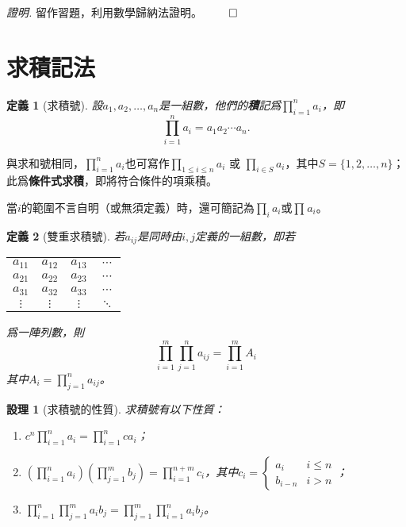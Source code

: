 \documentclass[12pt]{article}
\newtheorem{definition}{定義}
\newtheorem*{proposition}{設理}
\renewenvironment*{proof}{\textit{證明.}}{\hfill$\qed$}
\begin{document}
    \begin{proof}
        留作習題，利用數學歸納法證明。
    \end{proof}

    \section*{求積記法}

    \begin{definition}[求積號]
        設$a_1,a_2,\dots,a_n$是一組數，他們的\textbf{積}記爲$\displaystyle \prod_{i=1}^{n}a_i$，即$$\prod_{i=1}^{n}a_i=a_1a_2\cdots a_n.$$
    \end{definition}

    與求和號相同，$\displaystyle \prod_{i=1}^{n}a_i$也可寫作$\displaystyle \prod_{1\leq i\leq n} a_i$ 或 $\displaystyle\prod_{i\in S}a_i$，其中$S=\{1,2,\dots,n\}$；此爲\textbf{條件式求積}，即將符合條件的項乘積。

    當$i$的範圍不言自明（或無須定義）時，還可簡記為$\displaystyle\prod_{i}a_i$或$\prod_{} a_i$。

    \begin{definition}[雙重求積號]
        若$a_{ij}$是同時由$i,j$定義的一組數，即若
        \begin{center}
            \begin{tabular}{c c c c}
                $a_{11}$&$a_{12}$&$a_{13}$&$\cdots$\\
                $a_{21}$&$a_{22}$&$a_{23}$&$\cdots$\\
                $a_{31}$&$a_{32}$&$a_{33}$&$\cdots$\\
                $\vdots$&$\vdots$&$\vdots$&$\ddots$
            \end{tabular}
        \end{center}
        爲一陣列數，則$$\prod_{i=1}^{m}\prod_{j=1}^{n}a_{ij}=\prod_{i=1}^{m}A_i$$其中$\displaystyle A_i=\prod_{j=1}^{n}a_{ij}$。
    \end{definition}

    \begin{proposition}[求積號的性質]
        求積號有以下性質：\begin{enumerate}
            \item $\displaystyle c^n\prod_{i=1}^{n}a_i=\prod_{i=1}^{n}ca_i$；
            \item $\displaystyle (\prod_{i=1}^{n}a_i)(\prod_{j=1}^{m}b_j)=\prod_{i=1}^{n+m}c_i$，其中$c_i=\begin{cases}
                a_i&i\leq n\\
                b_{i-n}&i>n 
            \end{cases}$；
            \item $\displaystyle \prod_{i=1}^{n}\prod_{j=1}^{m}a_ib_j=\prod_{j=1}^{m}\prod_{i=1}^{n}a_ib_j$。
        \end{enumerate}
    \end{proposition}
\end{document}
